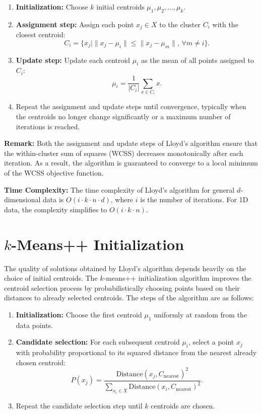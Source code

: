 \begin{enumerate}[leftmargin=*]
    \item \textbf{Initialization:} Choose \(k\) initial centroids \(\mu_1, \mu_2, \dots, \mu_k\).
    \item \textbf{Assignment step:} Assign each point \(x_j \in X\) to the cluster \(C_i\) with the closest centroid:
    \[
    C_i = \{x_j \mid \|x_j - \mu_i\| \leq \|x_j - \mu_m\|, \, \forall m \neq i\}.
    \]
    \item \textbf{Update step:} Update each centroid \(\mu_i\) as the mean of all points assigned to \(C_i\):
    \[
    \mu_i = \frac{1}{|C_i|} \sum_{x \in C_i} x.
    \]
    \item Repeat the assignment and update steps until convergence, typically when the centroids no longer change significantly or a maximum number of iterations is reached.
\end{enumerate}

\noindent \textbf{Remark:}  
Both the assignment and update steps of Lloyd's algorithm ensure that the within-cluster sum of squares (WCSS) decreases monotonically after each iteration. As a result, the algorithm is guaranteed to converge to a local minimum of the WCSS objective function.

\noindent \textbf{Time Complexity:}  
The time complexity of Lloyd’s algorithm for general \(d\)-dimensional data is \(O(i \cdot k \cdot n \cdot d)\), where \(i\) is the number of iterations. For 1D data, the complexity simplifies to \(O(i \cdot k \cdot n)\).

\section{$k$-Means++ Initialization}\label{sec:kmeanspp}

The quality of solutions obtained by Lloyd’s algorithm depends heavily on the choice of initial centroids. The $k$-means++ initialization algorithm \cite{kmeansplusplus} improves the centroid selection process by probabilistically choosing points based on their distances to already selected centroids. The steps of the algorithm are as follows:

\begin{enumerate}[leftmargin=*]
    \item \textbf{Initialization:} Choose the first centroid \(\mu_1\) uniformly at random from the data points.
    \item \textbf{Candidate selection:} For each subsequent centroid \(\mu_i\), select a point \(x_j\) with probability proportional to its squared distance from the nearest already chosen centroid:
    \[
    P(x_j) = \frac{\text{Distance}(x_j, C_{\text{nearest}})^2}{\sum_{x_i \in X} \text{Distance}(x_i, C_{\text{nearest}})^2}.
    \]
    \item Repeat the candidate selection step until \(k\) centroids are chosen.
\end{enumerate}

